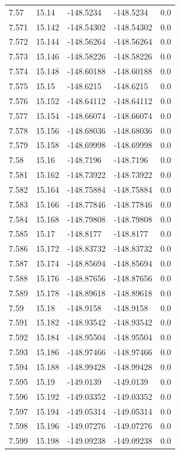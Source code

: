 \begin{tabular}{lllll}
7.57 & 15.14 & -148.5234 & -148.5234 & 0.0 \\
7.571 & 15.142 & -148.54302 & -148.54302 & 0.0 \\
7.572 & 15.144 & -148.56264 & -148.56264 & 0.0 \\
7.573 & 15.146 & -148.58226 & -148.58226 & 0.0 \\
7.574 & 15.148 & -148.60188 & -148.60188 & 0.0 \\
7.575 & 15.15 & -148.6215 & -148.6215 & 0.0 \\
7.576 & 15.152 & -148.64112 & -148.64112 & 0.0 \\
7.577 & 15.154 & -148.66074 & -148.66074 & 0.0 \\
7.578 & 15.156 & -148.68036 & -148.68036 & 0.0 \\
7.579 & 15.158 & -148.69998 & -148.69998 & 0.0 \\
7.58 & 15.16 & -148.7196 & -148.7196 & 0.0 \\
7.581 & 15.162 & -148.73922 & -148.73922 & 0.0 \\
7.582 & 15.164 & -148.75884 & -148.75884 & 0.0 \\
7.583 & 15.166 & -148.77846 & -148.77846 & 0.0 \\
7.584 & 15.168 & -148.79808 & -148.79808 & 0.0 \\
7.585 & 15.17 & -148.8177 & -148.8177 & 0.0 \\
7.586 & 15.172 & -148.83732 & -148.83732 & 0.0 \\
7.587 & 15.174 & -148.85694 & -148.85694 & 0.0 \\
7.588 & 15.176 & -148.87656 & -148.87656 & 0.0 \\
7.589 & 15.178 & -148.89618 & -148.89618 & 0.0 \\
7.59 & 15.18 & -148.9158 & -148.9158 & 0.0 \\
7.591 & 15.182 & -148.93542 & -148.93542 & 0.0 \\
7.592 & 15.184 & -148.95504 & -148.95504 & 0.0 \\
7.593 & 15.186 & -148.97466 & -148.97466 & 0.0 \\
7.594 & 15.188 & -148.99428 & -148.99428 & 0.0 \\
7.595 & 15.19 & -149.0139 & -149.0139 & 0.0 \\
7.596 & 15.192 & -149.03352 & -149.03352 & 0.0 \\
7.597 & 15.194 & -149.05314 & -149.05314 & 0.0 \\
7.598 & 15.196 & -149.07276 & -149.07276 & 0.0 \\
7.599 & 15.198 & -149.09238 & -149.09238 & 0.0 \\

\end{tabular}
